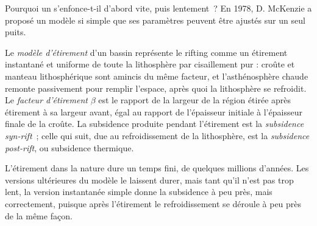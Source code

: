 Pourquoi un  s'enfonce-t-il d'abord vite, puis lentement~? En 1978, D. McKenzie a proposé un modèle si
simple que ses paramètres peuvent être ajustés sur un seul puits.

\begin{definition}\label{def:b2:basins-compared:stretching}
Le \emph{modèle d'étirement} d'un bassin représente le rifting comme un
étirement instantané et uniforme de toute la lithosphère par cisaillement pur : croûte et manteau
lithosphérique sont amincis du même facteur, et l'asthénosphère chaude remonte passivement pour remplir
l'espace, après quoi la lithosphère se refroidit. Le \emph{facteur d'étirement}
$\beta$ est le rapport de la largeur de la région étirée après étirement à sa largeur avant,
égal au rapport de l'épaisseur initiale à l'épaisseur finale de la croûte. La subsidence produite
pendant l'étirement est la \emph{subsidence syn-rift}~; celle qui suit,
due au refroidissement de la lithosphère, est la \emph{subsidence
post-rift}, ou subsidence thermique.
\end{definition}

L'étirement dans la nature dure un temps fini, de quelques millions d'années. Les versions ultérieures du modèle le laissent
durer, mais tant qu'il n'est pas trop lent, la version instantanée simple donne la subsidence à peu près, mais correctement,
puisque après l'étirement le refroidissement se déroule à peu près de la même façon.

